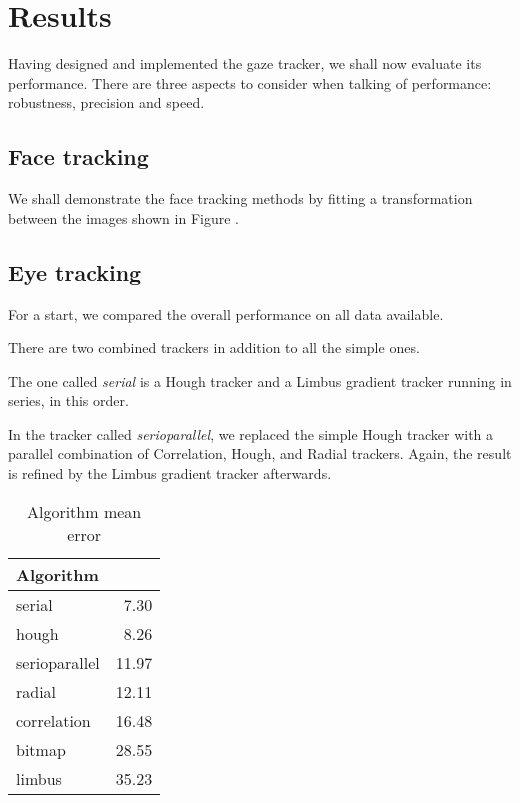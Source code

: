 \chapter{Results}
\label{s:results}
Having designed and implemented the gaze tracker, we shall now evaluate its performance.
There are three aspects to consider when talking of performance: robustness, precision and speed.

\section{Face tracking}
We shall demonstrate the face tracking methods by fitting a transformation between the images shown in Figure .


\section{Eye tracking}

For a start, we compared the overall performance on all data available.

There are two combined trackers in addition to all the simple ones.

The one called \textit{serial} is a Hough tracker and a Limbus gradient tracker running in series, in this order.

In the tracker called \textit{serioparallel}, we replaced the simple Hough tracker with a parallel combination of Correlation, Hough, and Radial trackers.
Again, the result is refined by the Limbus gradient tracker afterwards.

\begin{table}[h]
\centering
\begin{tabular}{l@{\hspace{1.5cm}}D{.}{.}{3.2}}
\toprule
\textbf{Algorithm} &  \\
\midrule
serial & 7.30 \\
hough & 8.26 \\
serioparallel & 11.97 \\
radial & 12.11 \\
correlation & 16.48 \\
bitmap & 28.55 \\
limbus & 35.23 \\
\bottomrule
\end{tabular}
\caption{Algorithm mean error}\label{t:algo-mean}
\end{table}

